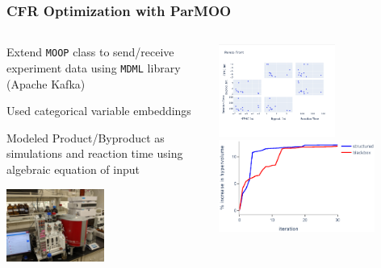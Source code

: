 \documentclass[aspectratio=169]{beamer}
\begin{document}
\begin{frame}\frametitle{CFR Optimization with ParMOO}

\begin{columns}
\begin{column}{0.5\textwidth}

\medskip
Extend {\tt MOOP} class to send/receive experiment data
using {\tt MDML} library (Apache Kafka)

\medskip
Used categorical variable embeddings

\medskip
Modeled Product/Byproduct as simulations and reaction time using algebraic
equation of input

\begin{center}
\includegraphics[width=0.5\textwidth]{lab_setup.jpg}\\
\end{center}
\end{column}
\begin{column}{0.5\textwidth}
\begin{center}
\includegraphics[width=0.6\textwidth]{cfr_pareto_front.png}\\
\includegraphics[width=0.8\textwidth]{hv_2.eps}
\end{center}
\end{column}
\end{columns}


\end{frame}
\end{document}
